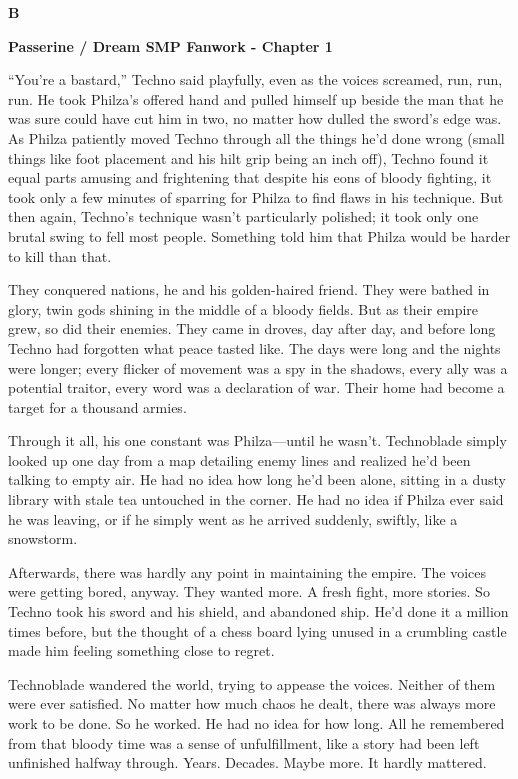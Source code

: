 \documentclass{exam-zh}
\begin{document}
{\centering \bfseries B \par}

{\centering \bfseries Passerine / Dream SMP Fanwork - Chapter 1 \par}

“You’re a bastard,” Techno said playfully, even as the voices screamed, run, run, run. He took Philza’s offered hand and pulled himself up beside the man that he was sure could have cut him in two, no matter how dulled the sword’s edge was. As Philza patiently moved Techno through all the things he’d done wrong (small things like foot placement and his hilt grip being an inch off), Techno found it equal parts amusing and frightening that despite his eons of bloody fighting, it took only a few minutes of sparring for Philza to find flaws in his technique. But then again, Techno’s technique wasn’t particularly polished; it took only one brutal swing to fell most people. Something told him that Philza would be harder to kill than that.

They conquered nations, he and his golden-haired friend. They were bathed in glory, twin gods shining in the middle of a bloody fields. But as their empire grew, so did their enemies. They came in droves, day after day, and before long Techno had forgotten what peace tasted like. The days were long and the nights were longer; every flicker of movement was a spy in the shadows, every ally was a potential traitor, every word was a declaration of war. Their home had become a target for a thousand armies.

Through it all, his one constant was Philza—until he wasn’t. Technoblade simply looked up one day from a map detailing enemy lines and realized he’d been talking to empty air. He had no idea how long he’d been alone, sitting in a dusty library with stale tea untouched in the corner. He had no idea if Philza ever said he was leaving, or if he simply went as he arrived suddenly, swiftly, like a snowstorm.

Afterwards, there was hardly any point in maintaining the empire. The voices were getting bored, anyway. They wanted more. A fresh fight, more stories. So Techno took his sword and his shield, and abandoned ship. He’d done it a million times before, but the thought of a chess board lying unused in a crumbling castle made him feeling something close to regret.

Technoblade wandered the world, trying to appease the voices. Neither of them were ever satisfied. No matter how much chaos he dealt, there was always more work to be done. So he worked. He had no idea for how long. All he remembered from that bloody time was a sense of unfulfillment, like a story had been left unfinished halfway through. Years. Decades. Maybe more. It hardly mattered.
\end{document}

